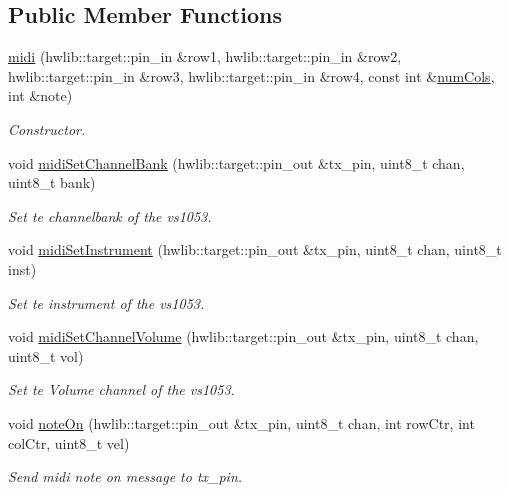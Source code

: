 \subsection*{Public Member Functions}
\begin{DoxyCompactItemize}
\item 
\hyperlink{classlight_music_1_1midi_a07cce4974be1f6bc22238c15cdba5867}{midi} (hwlib\+::target\+::pin\+\_\+in \&row1, hwlib\+::target\+::pin\+\_\+in \&row2, hwlib\+::target\+::pin\+\_\+in \&row3, hwlib\+::target\+::pin\+\_\+in \&row4, const int \&\hyperlink{classlight_music_1_1key_matrix_ab9fa44924cb5e674870f2602f92b39d3}{num\+Cols}, int \&note)
\begin{DoxyCompactList}\small\item\em Constructor. \end{DoxyCompactList}\item 
void \hyperlink{classlight_music_1_1midi_a4d5928a15254e3a087130349205a11ec}{midi\+Set\+Channel\+Bank} (hwlib\+::target\+::pin\+\_\+out \&tx\+\_\+pin, uint8\+\_\+t chan, uint8\+\_\+t bank)
\begin{DoxyCompactList}\small\item\em Set te channelbank of the vs1053. \end{DoxyCompactList}\item 
void \hyperlink{classlight_music_1_1midi_a5478f0b47275719046e67d673570f87f}{midi\+Set\+Instrument} (hwlib\+::target\+::pin\+\_\+out \&tx\+\_\+pin, uint8\+\_\+t chan, uint8\+\_\+t inst)
\begin{DoxyCompactList}\small\item\em Set te instrument of the vs1053. \end{DoxyCompactList}\item 
void \hyperlink{classlight_music_1_1midi_aa83675530bb23b24e50d1346431d2f1f}{midi\+Set\+Channel\+Volume} (hwlib\+::target\+::pin\+\_\+out \&tx\+\_\+pin, uint8\+\_\+t chan, uint8\+\_\+t vol)
\begin{DoxyCompactList}\small\item\em Set te Volume channel of the vs1053. \end{DoxyCompactList}\item 
void \hyperlink{classlight_music_1_1midi_a01bcd1c91476ac59cc6be090b2b1daef}{note\+On} (hwlib\+::target\+::pin\+\_\+out \&tx\+\_\+pin, uint8\+\_\+t chan, int row\+Ctr, int col\+Ctr, uint8\+\_\+t vel)
\begin{DoxyCompactList}\small\item\em Send midi note on message to tx\+\_\+pin. \end{DoxyCompactList}\item 

\end{DoxyCompactItemize}
